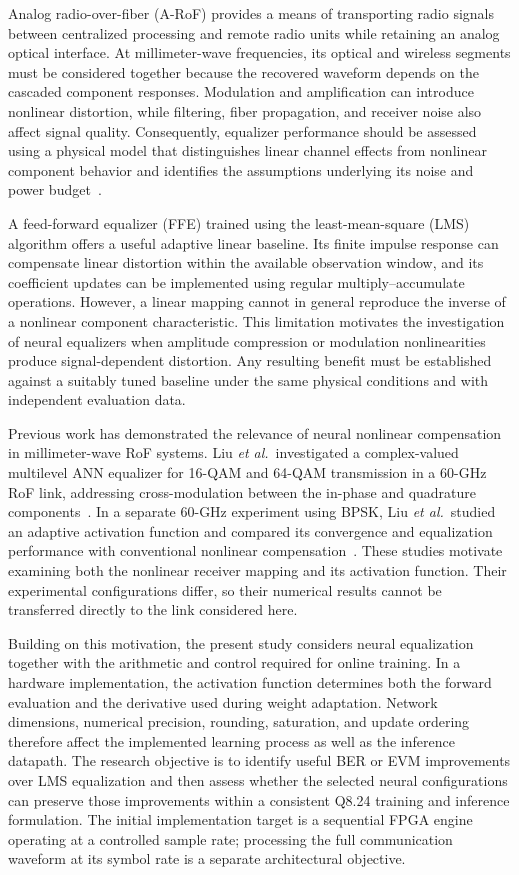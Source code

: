 Analog radio-over-fiber (A-RoF) provides a means of transporting radio signals between centralized processing and remote radio units while retaining an analog optical interface. At millimeter-wave frequencies, its optical and wireless segments must be considered together because the recovered waveform depends on the cascaded component responses. Modulation and amplification can introduce nonlinear distortion, while filtering, fiber propagation, and receiver noise also affect signal quality. Consequently, equalizer performance should be assessed using a physical model that distinguishes linear channel effects from nonlinear component behavior and identifies the assumptions underlying its noise and power budget~\cite{song2024performance}.

A feed-forward equalizer (FFE) trained using the least-mean-square (LMS) algorithm offers a useful adaptive linear baseline. Its finite impulse response can compensate linear distortion within the available observation window, and its coefficient updates can be implemented using regular multiply--accumulate operations. However, a linear mapping cannot in general reproduce the inverse of a nonlinear component characteristic. This limitation motivates the investigation of neural equalizers when amplitude compression or modulation nonlinearities produce signal-dependent distortion. Any resulting benefit must be established against a suitably tuned baseline under the same physical conditions and with independent evaluation data.

Previous work has demonstrated the relevance of neural nonlinear compensation in millimeter-wave RoF systems. Liu \emph{et al.}\ investigated a complex-valued multilevel ANN equalizer for 16-QAM and 64-QAM transmission in a 60-GHz RoF link, addressing cross-modulation between the in-phase and quadrature components~\cite{liu2017multilevel}. In a separate 60-GHz experiment using BPSK, Liu \emph{et al.}\ studied an adaptive activation function and compared its convergence and equalization performance with conventional nonlinear compensation~\cite{liu2017adaptive}. These studies motivate examining both the nonlinear receiver mapping and its activation function. Their experimental configurations differ, so their numerical results cannot be transferred directly to the link considered here.

Building on this motivation, the present study considers neural equalization together with the arithmetic and control required for online training. In a hardware implementation, the activation function determines both the forward evaluation and the derivative used during weight adaptation. Network dimensions, numerical precision, rounding, saturation, and update ordering therefore affect the implemented learning process as well as the inference datapath. The research objective is to identify useful BER or EVM improvements over LMS equalization and then assess whether the selected neural configurations can preserve those improvements within a consistent Q8.24 training and inference formulation. The initial implementation target is a sequential FPGA engine operating at a controlled sample rate; processing the full communication waveform at its symbol rate is a separate architectural objective.
